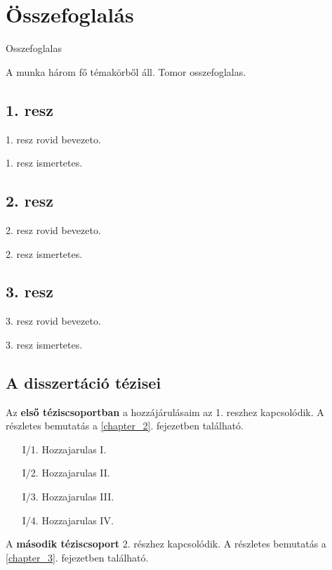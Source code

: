 
\chapter*{Összefoglalás}

Osszefoglalas

A munka három fő témakörből áll. Tomor osszefoglalas.

\section*{1. resz}

1. resz rovid bevezeto.

1. resz ismertetes.

\section*{2. resz}

2. resz rovid bevezeto.

2. resz ismertetes.

\newpage
\section*{3. resz}

3. resz rovid bevezeto.

3. resz ismertetes.
\newpage
\section*{A disszertáció tézisei}

Az \textbf{első téziscsoportban} a hozzájárulásaim az 1. reszhez kapcsolódik. A részletes bemutatás a \ref{chapter_2}. fejezetben található.

\begin{enumerate}[wide = 0pt, widest = {III/5.}, leftmargin =*]
    \item[I/1.] Hozzajarulas I.
    
    \item[I/2.] Hozzajarulas II.

    \item[I/3.] Hozzajarulas III.
    
    \item[I/4.] Hozzajarulas IV.
\end{enumerate}

\noindent
A \textbf{második téziscsoport} 2. részhez kapcsolódik. A részletes bemutatás a \ref{chapter_3}. fejezetben található.

